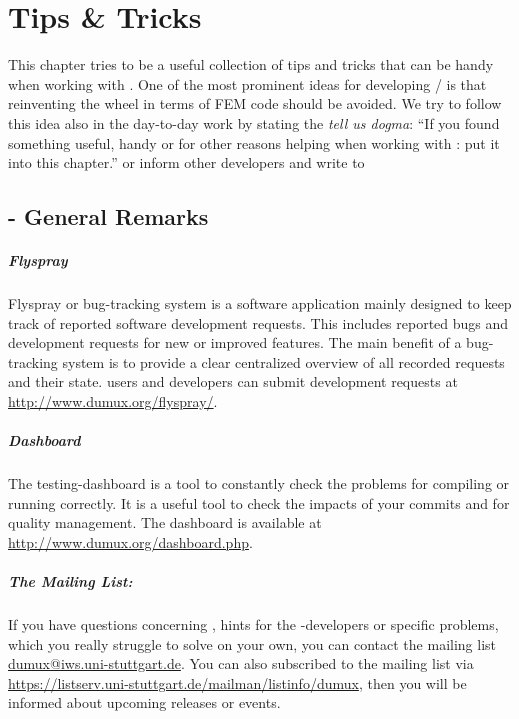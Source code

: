 \chapter{Tips \& Tricks}

This chapter tries to be a useful collection of tips and tricks that can be handy
when working with \Dumux. One of the most prominent ideas for developing
\Dune / \Dumux is that reinventing the wheel in terms of FEM code should
be avoided. We try to follow this idea also in the day-to-day work by
stating the \emph{tell us dogma}: ``If you found something useful, 
handy or for other reasons helping when working with \Dumux: put it into
this chapter.'' or inform other developers and write to 

\section{\Dumux - General Remarks}

\paragraph{Flyspray}
Flyspray or bug-tracking system is a software application mainly designed to
keep track of reported software development requests. This includes reported
bugs and development requests for new or improved features. The main benefit
of a bug-tracking system is to provide a clear centralized overview of all
recorded requests and their state. \Dumux users and developers can submit
development requests at \url{http://www.dumux.org/flyspray/}.

\paragraph{Dashboard}
The testing-dashboard is a tool to constantly check the \Dumux problems for compiling
or running correctly. It is a useful tool to check the impacts of your commits
and for quality management. The dashboard is available at 
\url{http://www.dumux.org/dashboard.php}.

\paragraph{The \Dumux Mailing List:}
If you have questions concerning \Dumux, hints for the \Dumux-developers
or specific problems, which you really struggle to solve on your own,
you can contact the mailing list \url{dumux@iws.uni-stuttgart.de}.
You can also subscribed to the mailing list via
\url{https://listserv.uni-stuttgart.de/mailman/listinfo/dumux}, then you
will be informed about upcoming releases or events.

